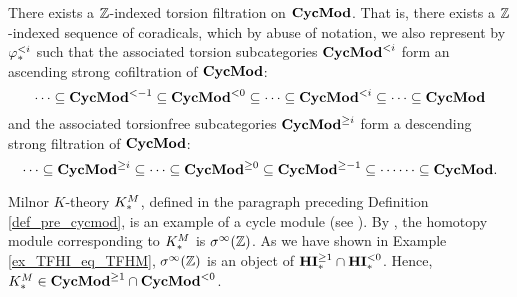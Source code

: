 \begin{cor}\label{cor_tor_filt_on_CycMod}
There exists a $\mathbb{Z}$-indexed torsion filtration on $\mathbf{CycMod}$. That
is, there exists a $\mathbb{Z}$-indexed sequence of coradicals, which by abuse
of notation, we also represent by $\varphi^{< i}_{*}$ such that the 
associated torsion subcategories $\mathbf{CycMod}^{< i}$ form an ascending 
strong cofiltration of $\mathbf{CycMod}$:
\[
\cdots \subseteq \mathbf{CycMod}^{< -1} \subseteq \mathbf{CycMod}^{< 0} \subseteq \cdots 
   \subseteq \mathbf{CycMod}^{< i} \subseteq \cdots 
   \subseteq \mathbf{CycMod}
\]
and the associated torsionfree subcategories $\mathbf{CycMod}^{\geq i}$
form a descending strong filtration of $\mathbf{CycMod}$:
\[
\cdots \subseteq \mathbf{CycMod}^{\geq i} \subseteq 
   \cdots \subseteq \mathbf{CycMod}^{\geq 0} \subseteq \mathbf{CycMod}^{\geq -1} \subseteq \cdots
   \cdots \subseteq \mathbf{CycMod}.
\]
\end{cor}

\begin{ex}\label{ex_milK}
Milnor $K$-theory $K^M_*$, defined in the paragraph preceding 
Definition \ref{def_pre_cycmod}, is an example of a cycle module 
(see \cite[1.4, 2.5]{Rost96}). By \cite[3.7]{DegModHom}, the 
homotopy module corresponding to $K^M_*$ is $\sigma^\infty(\mathbb{Z})$. As 
we have shown in Example \ref{ex_TFHI_eq_TFHM}, $\sigma^\infty(\mathbb{Z})$ is 
an object of $\mathbf{HI}_*^{\geq 1} \cap \mathbf{HI}_*^{< 0}$. Hence, $K^M_*
\in \mathbf{CycMod}^{\geq 1} \cap \mathbf{CycMod}^{< 0}$.
\end{ex}
